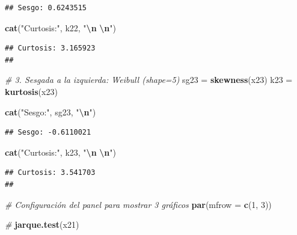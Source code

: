\documentclass[
]{article}
\newenvironment{Shaded}{\begin{snugshade}}{\end{snugshade}}
\newcommand{\AttributeTok}[1]{\textcolor[rgb]{0.13,0.29,0.53}{#1}}
\newcommand{\CommentTok}[1]{\textcolor[rgb]{0.56,0.35,0.01}{\textit{#1}}}
\newcommand{\DecValTok}[1]{\textcolor[rgb]{0.00,0.00,0.81}{#1}}
\newcommand{\FunctionTok}[1]{\textcolor[rgb]{0.13,0.29,0.53}{\textbf{#1}}}
\newcommand{\NormalTok}[1]{#1}
\newcommand{\OtherTok}[1]{\textcolor[rgb]{0.56,0.35,0.01}{#1}}
\newcommand{\SpecialCharTok}[1]{\textcolor[rgb]{0.81,0.36,0.00}{\textbf{#1}}}
\newcommand{\StringTok}[1]{\textcolor[rgb]{0.31,0.60,0.02}{#1}}
\begin{document}
\begin{verbatim}
## Sesgo: 0.6243515
\end{verbatim}

\begin{Shaded}
\begin{Highlighting}[]
\FunctionTok{cat}\NormalTok{(}\StringTok{"Curtosis:"}\NormalTok{, k22, }\StringTok{"}\SpecialCharTok{\textbackslash{}n}\StringTok{ }\SpecialCharTok{\textbackslash{}n}\StringTok{"}\NormalTok{)}
\end{Highlighting}
\end{Shaded}

\begin{verbatim}
## Curtosis: 3.165923 
## 
\end{verbatim}

\begin{Shaded}
\begin{Highlighting}[]
\CommentTok{\# 3. Sesgada a la izquierda: Weibull (shape=5)}
\NormalTok{sg23 }\OtherTok{=} \FunctionTok{skewness}\NormalTok{(x23)}
\NormalTok{k23 }\OtherTok{=} \FunctionTok{kurtosis}\NormalTok{(x23)}

\FunctionTok{cat}\NormalTok{(}\StringTok{"Sesgo:"}\NormalTok{, sg23, }\StringTok{"}\SpecialCharTok{\textbackslash{}n}\StringTok{"}\NormalTok{)}
\end{Highlighting}
\end{Shaded}

\begin{verbatim}
## Sesgo: -0.6110021
\end{verbatim}

\begin{Shaded}
\begin{Highlighting}[]
\FunctionTok{cat}\NormalTok{(}\StringTok{"Curtosis:"}\NormalTok{, k23, }\StringTok{"}\SpecialCharTok{\textbackslash{}n}\StringTok{ }\SpecialCharTok{\textbackslash{}n}\StringTok{"}\NormalTok{)}
\end{Highlighting}
\end{Shaded}

\begin{verbatim}
## Curtosis: 3.541703 
## 
\end{verbatim}

\begin{Shaded}
\begin{Highlighting}[]
\CommentTok{\# Configuración del panel para mostrar 3 gráficos}
\FunctionTok{par}\NormalTok{(}\AttributeTok{mfrow =} \FunctionTok{c}\NormalTok{(}\DecValTok{1}\NormalTok{, }\DecValTok{3}\NormalTok{))}

\CommentTok{\#}
\FunctionTok{jarque.test}\NormalTok{(x21)}
\end{Highlighting}
\end{Shaded}
\end{document}
